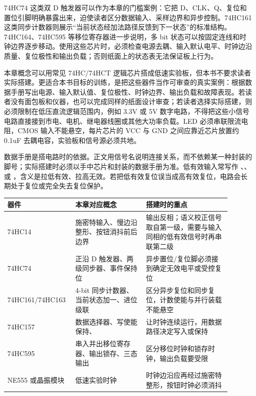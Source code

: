 \begin{chipcase}
74HC74 这类双 D 触发器可以作为本章的门槛案例：它把 D、CLK、Q、复位和置位引脚明确暴露出来，迫使读者区分数据输入、采样边界和异步控制。74HC161 这类同步计数器则展示“当前状态经加法路径反馈到下一状态”的标准结构。74HC164、74HC595 等移位寄存器进一步说明，多 bit 状态可以按固定连线和时钟边界逐步移动。使用这些芯片时，必须检查电源去耦、输入默认电平、时钟边沿质量、复位极性和输出负载；否则纸面上的状态表无法保证板上行为。
\end{chipcase}


本章概念可以用常见 74HC/74HCT 逻辑芯片搭成低速实验板，但本书不要求读者实际搭建。更适合本书目标的训练，是把这些器件当作可审查的真实案例：根据数据手册写出电源、输入默认值、复位极性、时钟边界、输出负载和故障表现。若读者没有面包板和仪器，也可以完成同样的纸面设计审查；若读者选择实际搭建，则必须限制在低压直流逻辑范围内，例如 3.3V 或 5V 数字电路，不得把这些小信号电路直接接到市电、电机、继电器线圈或其他大功率负载。LED 必须串联限流电阻，CMOS 输入不能悬空，每片芯片的 VCC 与 GND 之间应靠近芯片放置约 0.1uF 去耦电容，实验板和信号源必须共地。

数据手册是搭电路时的依据。正文用信号名说明连接关系，而不依赖某一种封装的脚号；实际搭建时必须以手中芯片和封装的数据手册为准。低有效输入常写作 、、 或 ，含义是拉低有效、拉高无效。若把低有效复位误当成高有效复位，电路会长期处于复位或完全失去复位保护。

\begin{longtable}{L{0.24\linewidth}L{0.3\linewidth}L{0.36\linewidth}}
\toprule
器件 & 本章对应概念 & 搭建时的重点 \\
\midrule
74HC14 & 施密特输入、慢边沿整形、按钮消抖前后边界 & 输出反相；语义校正信号取自第一级，需要与输入同相的低有效信号时再串联第二级 \\
74HC74 & 正沿 D 触发器、两级同步器、事件保持位 & 异步置位/复位脚必须接到确定无效电平或受控复位 \\
74HC161/74HC163 & 4-bit 同步计数器、当前状态加一、进位级联 & 区分异步复位和同步复位，计数使能与并行装载不能悬空 \\
74HC157 & 数据选择器、写使能保持、 & 让时钟连续运行，用数据路径决定写入或保持 \\
74HC595 & 串入并出移位寄存器、输出锁存、三态输出 & 区分移位时钟和锁存时钟，输出负载要受限 \\
NE555 或晶振模块 & 低速实验时钟 & 时钟边沿应再经过施密特整形，按钮时钟必须消抖 \\
\bottomrule
\end{longtable}

